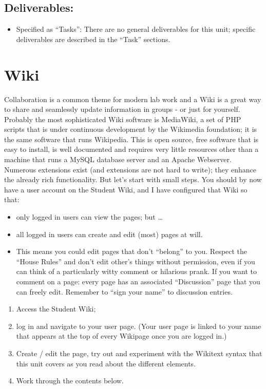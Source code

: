 \documentclass[]{book}
\providecommand{\tightlist}{%
  \setlength{\itemsep}{0pt}\setlength{\parskip}{0pt}}
\begin{document}
\subsection{Deliverables:}\label{deliverables}

\begin{itemize}
\tightlist
\item
  Specified as ``Tasks'': There are no general deliverables for this
  unit; specific deliverables are described in the ``Task'' sections.
\end{itemize}

\hypertarget{wiki}{\section{Wiki}\label{wiki}}

Collaboration is a common theme for modern lab work and a Wiki is a
great way to share and seamlessly update information in groups - or just
for yourself. Probably the most sophisticated Wiki software is
MediaWiki, a set of PHP scripts that is under continuous development by
the Wikimedia foundation; it is the same software that runs Wikipedia.
This is open source, free software that is easy to install, is well
documented and requires very little resources other than a machine that
runs a MySQL database server and an Apache Webserver. Numerous
extensions exist (and extensions are not hard to write); they enhance
the already rich functionality. But let's start with small steps. You
should by now have a user account on the Student Wiki, and I have
configured that Wiki so that:

\begin{itemize}
\tightlist
\item
  only logged in users can view the pages; but \ldots{}
\item
  all logged in users can create and edit (most) pages at will.
\item
  This means you could edit pages that don't ``belong'' to you. Respect
  the ``House Rules'' and don't edit other's things without permission,
  even if you can think of a particularly witty comment or hilarious
  prank. If you want to comment on a page: every page has an associated
  ``Discussion'' page that you can freely edit. Remember to ``sign your
  name'' to discussion entries.
\end{itemize}

\begin{rmd-task}
\begin{enumerate}
\def\labelenumi{\arabic{enumi}.}
\tightlist
\item
  Access the Student Wiki;
\item
  log in and navigate to your user page. (Your user page is linked to
  your name that appears at the top of every Wikipage once you are
  logged in.)
\item
  Create / edit the page, try out and experiment with the Wikitext
  syntax that this unit covers as you read about the different elements.
\item
  Work through the contents below.
\end{enumerate}
\end{rmd-task}
\end{document}
